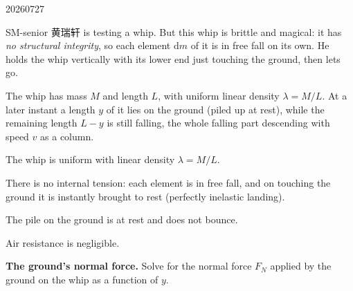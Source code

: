 

\begin{problem}{20260727}

SM-senior 黄瑞轩 is testing a whip.  But this whip is brittle and magical: it has \emph{no structural integrity}, so each element $\mathrm{d}m$ of it is in free fall on its own.  He holds the whip vertically with its lower end just touching the ground, then lets go.

The whip has mass $M$ and length $L$, with uniform linear density $\lambda = M/L$.  At a later instant a length $y$ of it lies on the ground (piled up at rest), while the remaining length $L - y$ is still falling, the whole falling part descending with speed $v$ as a column.

\begin{assumptions}
  \item The whip is uniform with linear density $\lambda = M/L$.
  \item There is no internal tension: each element is in free fall, and on touching the ground it is instantly brought to rest (perfectly inelastic landing).
  \item The pile on the ground is at rest and does not bounce.
  \item Air resistance is negligible.
\end{assumptions}

\begin{questions}
  \item \textbf{The ground's normal force.}
        Solve for the normal force $F_N$ applied by the ground on the whip as a function of $y$.
\end{questions}

\end{problem}


